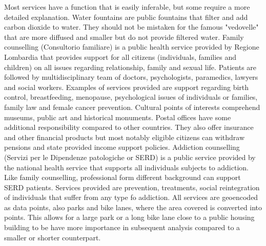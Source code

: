 \documentclass[11pt, titlepage]{article}
\begin{document}
Most services have a function that is easily inferable, but some require a more detailed explanation. Water fountains are public fountains that filter and add carbon dioxide to water. They should not be mistaken for the famous "vedovelle" that are more diffused and smaller but  do not provide filtered water. Family counselling (Consultorio familiare) is a public health service provided by Regione Lombardia that provides support for all citizens (individuals, families and children) on all issues regarding relationship, family and sexual life. Patients are followed by multidisciplinary team of doctors, psychologists, paramedics, lawyers and social workers. Examples of services provided are support regarding birth control, breastfeeding, menopause, psychological issues of individuals or families, family law and female cancer prevention. Cultural points of interests comprehend museums, public art and historical monuments. Postal offices have some additional responsibility compared to other countries. They also offer  insurance and other financial products but most notably eligible citizens can withdraw pensions and state provided income support policies. Addiction counselling (Servizi per le Dipendenze patologiche or SERD) is a public service provided by the national health service that supports all individuals subjects to addiction. Like family counselling, professional form different background can support SERD patients.  Services provided are prevention, treatments, social reintegration of individuals that suffer from any type fo addiction. All services are geoencoded as data points, also parks and bike lanes, where the area covered is converted into points. This allows for a large park or a long bike lane close to a public housing building to be have more importance in subsequent analysis compared to a smaller or shorter counterpart.  
\end{document}
